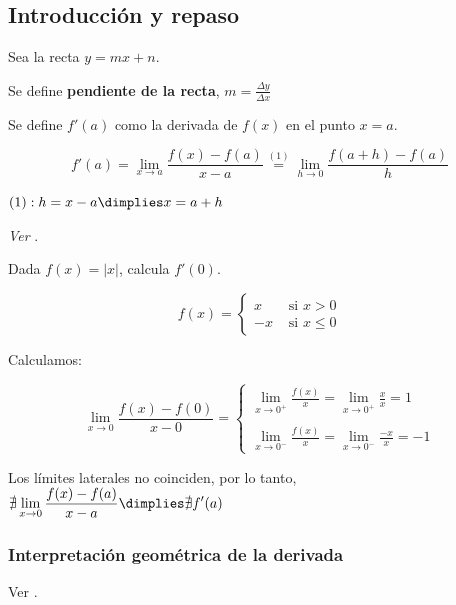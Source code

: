 \subsection{Introducción y repaso}
\begin{defn}
Sea la recta $y=mx+n$.

Se define \textbf{pendiente de la recta}, $m=\frac{\Delta y}{\Delta x}$
\end{defn}

\begin{defn}
Se define $f'(a)$ como la derivada de $f(x)$ en el punto $x=a$.

\[f'(a) = \lim_{x\to a}\frac{f(x)-f(a)}{x-a} \overset{(1)}{=} \lim_{h\to 0}\frac{f(a+h)-f(a)}{h}\]

$(1): h=x-a \dimplies x=a+h$

\textit{Ver }.
\end{defn}

\begin{example}
Dada $f(x) = |x|$, calcula $f'(0)$.

\[
f(x) = \begin{cases}x&\text{ si } x>0 \\ -x & \text{ si }x\leq 0\end{cases}
\]

Calculamos:

\[
\lim_{x\to 0}\frac{f(x)-f(0)}{x-0} = \begin{cases}
\displaystyle\lim_{x\to 0^+} \frac{f(x)}{x} = \displaystyle\lim_{x\to 0^+} \frac{x}{x} = 1\\\\
\displaystyle\lim_{x\to 0^-} \frac{f(x)}{x} = \displaystyle\lim_{x\to 0^-} \frac{-x}{x} = -1
\end{cases}
\]

\label{derivEjemplo}

Los límites laterales no coinciden, por lo tanto, $\nexists \displaystyle\lim_{x\to 0}\frac{f(x)-f(a)}{x-a} \dimplies \nexists f'(a)$
\end{example}




\subsubsection{Interpretación geométrica de la derivada}

Ver .

